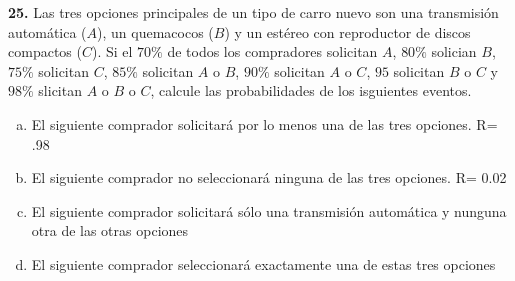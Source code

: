 \documentclass[12pt, letterpaper, spanish]{article}
\begin{document}
\textbf{25.} Las tres opciones principales de un tipo de carro nuevo son una transmisión automática ($A$), un quemacocos ($B$) y un estéreo con reproductor de discos compactos ($C$). Si el $70\%$ de todos los compradores solicitan $A$, $80\%$ solician $B$, $75\%$ solicitan $C$, $85\%$ solicitan $A$ o $B$, $90\%$ solicitan $A$ o $C$, $95$ solicitan $B$ o $C$ y $98\%$ slicitan $A$ o $B$ o $C$, calcule las probabilidades de los isguientes eventos.
\begin{enumerate}[a)]
    \item El siguiente comprador solicitará por lo menos una de las tres opciones. R= .98
    \item El siguiente comprador no seleccionará ninguna de las tres opciones. R= 0.02
    \item El siguiente comprador solicitará sólo una transmisión automática y nunguna otra de las otras opciones
    \item El siguiente comprador seleccionará exactamente una de estas tres opciones
\end{enumerate}
\end{document}
